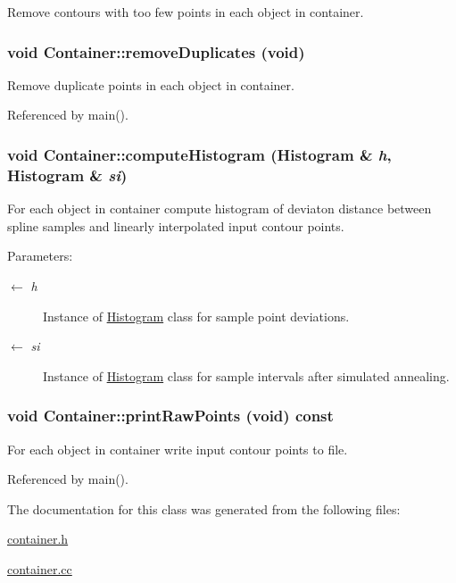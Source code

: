 Remove contours with too few points in each object in container. \hypertarget{classContainer_91af554e6c26c2a24183475c4f1e225d}{
\subsubsection[removeDuplicates]{\setlength{\rightskip}{0pt plus 5cm}void Container::removeDuplicates (void)}}
\label{classContainer_91af554e6c26c2a24183475c4f1e225d}


Remove duplicate points in each object in container. 

Referenced by main().\hypertarget{classContainer_6840fd00ce36c59241488608bbbd8bde}{
\subsubsection[computeHistogram]{\setlength{\rightskip}{0pt plus 5cm}void Container::computeHistogram ({\bf Histogram} \& {\em h}, \/  {\bf Histogram} \& {\em si})}}
\label{classContainer_6840fd00ce36c59241488608bbbd8bde}


For each object in container compute histogram of deviaton distance between spline samples and linearly interpolated input contour points. \begin{Desc}
\item[Parameters:]
\begin{description}
\item[\mbox{$\leftarrow$} {\em h}]Instance of \hyperlink{classHistogram}{Histogram} class for sample point deviations. \item[\mbox{$\leftarrow$} {\em si}]Instance of \hyperlink{classHistogram}{Histogram} class for sample intervals after simulated annealing. \end{description}
\end{Desc}
\hypertarget{classContainer_2e0f53094301a9dead5fdfa393fa5da8}{
\subsubsection[printRawPoints]{\setlength{\rightskip}{0pt plus 5cm}void Container::printRawPoints (void) const}}
\label{classContainer_2e0f53094301a9dead5fdfa393fa5da8}


For each object in container write input contour points to file. 

Referenced by main().

The documentation for this class was generated from the following files:\begin{CompactItemize}
\item 
\hyperlink{container_8h}{container.h}\item 
\hyperlink{container_8cc}{container.cc}\end{CompactItemize}
